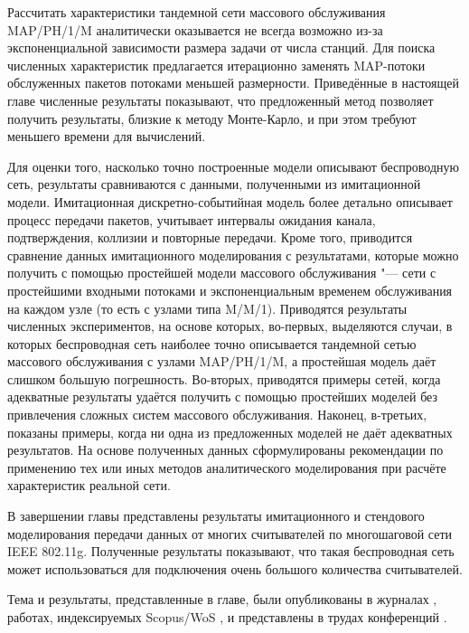 Рассчитать характеристики тандемной сети массового обслуживания MAP/PH/1/M аналитически оказывается не всегда возможно из-за экспоненциальной зависимости размера задачи от числа станций. Для поиска численных характеристик предлагается итерационно заменять MAP-потоки обслуженных пакетов потоками меньшей размерности. Приведённые в настоящей главе численные результаты показывают, что предложенный метод позволяет получить результаты, близкие к методу Монте-Карло, и при этом требуют меньшего времени для вычислений.

Для оценки того, насколько точно построенные модели описывают беспроводную сеть, результаты сравниваются с данными, полученными из имитационной модели. Имитационная дискретно-событийная модель более детально описывает процесс передачи пакетов, учитывает интервалы ожидания канала, подтверждения, коллизии и повторные передачи. Кроме того, приводится сравнение данных имитационного моделирования с результатами, которые можно получить с помощью простейшей модели массового обслуживания "--- сети с простейшими входными потоками и экспоненциальным временем обслуживания на каждом узле (то есть с узлами типа M/M/1). Приводятся результаты численных экспериментов, на основе которых, во-первых, выделяются случаи, в которых беспроводная сеть наиболее точно описывается тандемной сетью массового обслуживания с узлами MAP/PH/1/M, а простейшая модель даёт слишком большую погрешность. Во-вторых, приводятся примеры сетей, когда адекватные результаты удаётся получить с помощью простейших моделей без привлечения сложных систем массового обслуживания. Наконец, в-третьих, показаны примеры, когда ни одна из предложенных моделей не даёт адекватных результатов. На основе полученных данных сформулированы рекомендации по применению тех или иных методов аналитического моделирования при расчёте характеристик реальной сети.

В завершении главы представлены результаты имитационного и стендового моделирования передачи данных от многих считывателей по многошаговой сети IEEE 802.11g. Полученные результаты показывают, что такая беспроводная сеть может использоваться для подключения очень большого количества считывателей.

Тема и результаты, представленные в главе, были опубликованы в журналах \cite{WINET_IJPAM2016, WINET_TCOMM2015, QS_JITCS2013, QS_JPU2013, QS_TCOMM2012}, работах, индексируемых Scopus/WoS \cite{QS_ICAAPSP2020, QS_ITMM2019, QS_ITMM2017, QS_AICT2017, QS_ITMM2016, QS_DCCN2016_CCIS}, и представлены в трудах конференций \cite{WINET_DCCN2018, QS_ITTMM2015, QS_DCCN2015}.






